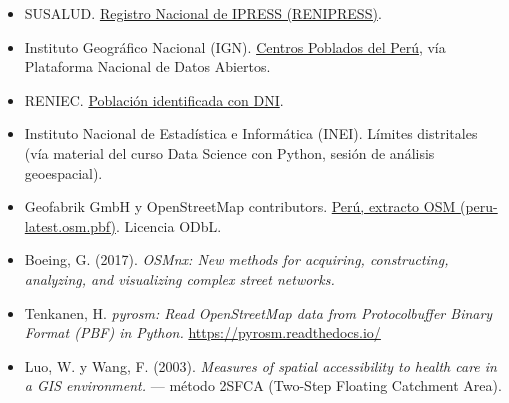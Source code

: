 \documentclass[11pt]{article}
\begin{document}
\begin{itemize}
\item SUSALUD. \href{https://www.datosabiertos.gob.pe/dataset/registro-nacional-de-ipress-renipress-superintendencia-nacional-de-salud-susalud}{Registro Nacional de IPRESS (RENIPRESS)}.
\item Instituto Geográfico Nacional (IGN). \href{https://www.datosabiertos.gob.pe/dataset/dataset-centros-poblados}{Centros Poblados del Perú}, vía Plataforma Nacional de Datos Abiertos.
\item RENIEC. \href{https://www.datosabiertos.gob.pe/dataset/reniec-poblaci\%C3\%B3n-identificada-con-dni-registro-nacional-de-identificaci\%C3\%B3n-y-estado-civil}{Población identificada con DNI}.
\item Instituto Nacional de Estadística e Informática (INEI). Límites
  distritales (vía material del curso Data Science con Python, sesión de
  análisis geoespacial).
\item Geofabrik GmbH y OpenStreetMap contributors. \href{https://download.geofabrik.de/south-america/peru.html}{Perú, extracto OSM (peru-latest.osm.pbf)}. Licencia ODbL.
\item Boeing, G. (2017). \emph{OSMnx: New methods for acquiring,
  constructing, analyzing, and visualizing complex street networks.}
\item Tenkanen, H. \emph{pyrosm: Read OpenStreetMap data from
  Protocolbuffer Binary Format (PBF) in Python.} \url{https://pyrosm.readthedocs.io/}
\item Luo, W. y Wang, F. (2003). \emph{Measures of spatial accessibility to
  health care in a GIS environment.} --- método 2SFCA (Two-Step Floating
  Catchment Area).
\end{itemize}
\end{document}
